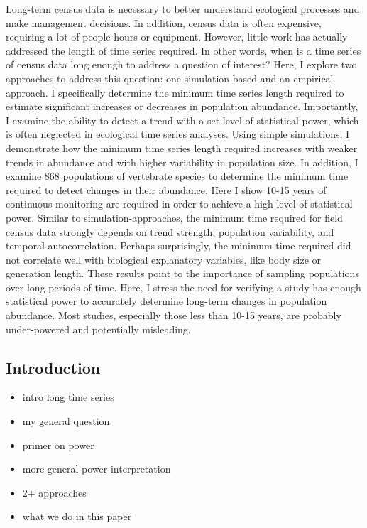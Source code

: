 \documentclass[11pt,]{article}
\providecommand{\tightlist}{%
  \setlength{\itemsep}{0pt}\setlength{\parskip}{0pt}}
\begin{document}
Long-term census data is necessary to better understand ecological
processes and make management decisions. In addition, census data is
often expensive, requiring a lot of people-hours or equipment. However,
little work has actually addressed the length of time series required.
In other words, when is a time series of census data long enough to
address a question of interest? Here, I explore two approaches to
address this question: one simulation-based and an empirical approach. I
specifically determine the minimum time series length required to
estimate significant increases or decreases in population abundance.
Importantly, I examine the ability to detect a trend with a set level of
statistical power, which is often neglected in ecological time series
analyses. Using simple simulations, I demonstrate how the minimum time
series length required increases with weaker trends in abundance and
with higher variability in population size. In addition, I examine 868
populations of vertebrate species to determine the minimum time required
to detect changes in their abundance. Here I show 10-15 years of
continuous monitoring are required in order to achieve a high level of
statistical power. Similar to simulation-approaches, the minimum time
required for field census data strongly depends on trend strength,
population variability, and temporal autocorrelation. Perhaps
surprisingly, the minimum time required did not correlate well with
biological explanatory variables, like body size or generation length.
These results point to the importance of sampling populations over long
periods of time. Here, I stress the need for verifying a study has
enough statistical power to accurately determine long-term changes in
population abundance. Most studies, especially those less than 10-15
years, are probably under-powered and potentially misleading.

\subsection{Introduction}\label{introduction}

\begin{itemize}
\tightlist
\item
  intro long time series
\item
  my general question
\item
  primer on power
\item
  more general power interpretation
\item
  2+ approaches
\item
  what we do in this paper
\end{itemize}
\end{document}
